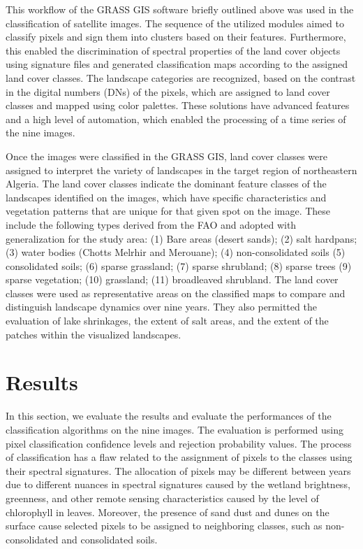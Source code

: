 \documentclass[asi,article,accept,pdftex,moreauthors]{Definitions/mdpi}
\begin{document}
This workflow of the GRASS GIS software briefly outlined above was used in the classification {of }satellite images. The sequence of the utilized modules aimed to classify pixels {and }sign them into clusters based on their features{. Furthermore, this enabled }the discrimination of spectral properties of the land cover objects using signature files and generated classification maps {according }to {the }assigned land cover classes. The landscape categories are recognized, {based on the} contrast in the {digital numbers} (DNs) {of the pixels}, which are assigned to land cover classes and mapped using color palettes. These solutions have advanced features and a high level of automation, which enabled the processing of a time series of the nine images.

Once the images were classified in {the }GRASS GIS, land cover classes were assigned to {interpret} the variety of landscapes in {the} target region of {}northeastern Algeria. The land cover classes indicate the dominant feature classes of the landscapes identified on the images, which have specific characteristics and vegetation patterns that are unique for that given spot on the image. These include the following types derived from the FAO and adopted  with generalization for the study area: (1) Bare areas (desert sands); (2) salt hardpans; (3) water bodies (Chotts Melrhir and Merouane); (4) non-consolidated soils (5) consolidated soils; (6) sparse grassland; (7) sparse shrubland; (8) sparse trees (9) sparse vegetation; (10) %
 grassland; (11) broadleaved shrubland. The land cover classes were used as representative areas {on} the classified maps to compare and distinguish{ landscape dynamics }over {nine} years. They also permitted {the evaluation of} lake shrinkages, the extent of {}salt areas, {} and the {extent of the patches within the }visualized landscapes. 

\section{Results}

{In this section, we evaluate the results and evaluate the performances of the classification algorithms on the nine images. The evaluation is performed using pixel classification confidence levels and rejection probability values. The process of classification has a flaw related to the assignment of pixels to the classes using their spectral signatures. The allocation of pixels may be different between years due to different nuances in spectral signatures caused by the wetland brightness, greenness, and other remote sensing characteristics caused by the level of chlorophyll in leaves. Moreover, the presence of sand dust and dunes on the surface cause selected pixels to be assigned to neighboring classes, such as non-consolidated and consolidated soils.}
\end{document}
